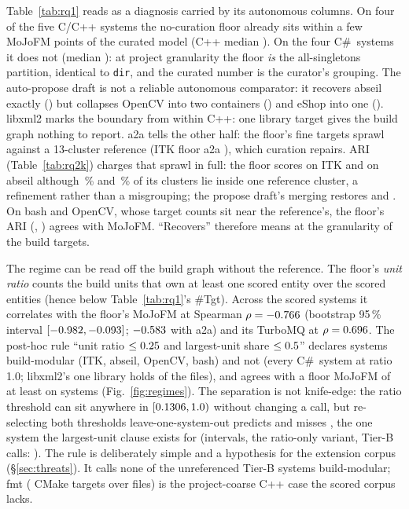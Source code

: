 Table~\ref{tab:rq1} reads as a diagnosis carried by its autonomous columns. On four of the five
C/C++ systems the no-curation floor already sits within a few MoJoFM points of the curated model
(C++ median \rqOneFloorCppMoJo{}). On the four C\#\ systems it does not (median
\rqOneFloorCsMoJo{}): at project granularity the floor \emph{is} the all-singletons partition,
identical to \texttt{dir}, and the curated number is the curator's grouping. The auto-propose
draft is not a reliable autonomous comparator: it recovers abseil exactly
(\rqOneProposeAbseilMoJo{}) but collapses OpenCV into two containers (\rqOneProposeOpencvMoJo{})
and eShop into one (\rqOneProposeEshopMoJo{}). libxml2 marks the boundary from within C++: one
library target gives the build graph nothing to report. a2a tells the other half: the floor's
fine targets sprawl against a 13-cluster reference (ITK floor a2a \rqOneFloorItkAtoA{}), which
curation repairs. ARI (Table~\ref{tab:rq2k}) charges that sprawl in full: the floor scores
\rqOneFloorItkAri{} on ITK and \rqOneFloorAbseilAri{} on abseil although \rqOneFloorItkNested{}\,\%
and \rqOneFloorAbseilNested{}\,\% of its clusters lie inside one reference cluster, a refinement
rather than a misgrouping; the propose draft's merging restores \rqOneProposeItkAri{} and
\rqOneProposeAbseilAri{}. On bash and OpenCV, whose target counts sit near the reference's, the
floor's ARI (\rqOneFloorBashAri{}, \rqOneFloorOpencvAri{}) agrees with MoJoFM. ``Recovers''
therefore means at the granularity of the build targets.

The regime can be read off the build graph without the reference. The floor's \emph{unit ratio}
counts the build units that own at least one scored entity over the scored entities (hence below
Table~\ref{tab:rq1}'s \#Tgt). Across the \rqAdequacyN{} scored systems it correlates with the
floor's MoJoFM at Spearman $\rho=-0.766{}$ (bootstrap 95\,\% interval
$[-0.982{}, -0.093{}]$; $-0.583{}$ with a2a) and its
TurboMQ at $\rho=0.696{}$. The post-hoc rule ``unit ratio
$\le0.25{}$ and largest-unit share $\le0.5{}$'' declares
\rqAdequacyAdequateCount{} systems build-modular (ITK, abseil, OpenCV, bash) and
\rqAdequacyInadequateCount{} not (every C\#\ system at ratio 1.0; libxml2's one library holds
\rqAdequacyLibxmlLargestShare{} of the files), and agrees with a floor MoJoFM of at least
\rqTwoRecoveredMin{} on \rqAdequacyRuleAgreement{} systems (Fig.~\ref{fig:regimes}). The
separation is not knife-edge: the ratio threshold can sit anywhere in
$[0.1306{}, 1.0{})$ without changing a call, but
re-selecting both thresholds leave-one-system-out predicts \rqAdequacyLooCorrect{} and misses
\rqAdequacyLooWrong{}, the one system the largest-unit clause exists for (intervals, the
ratio-only variant, Tier-B calls: \trDiagnostic{}). The rule is deliberately simple and a hypothesis for the extension corpus
(\S\ref{sec:threats}). It calls none of the \rqAdequacyTierBSystems{} unreferenced Tier-B
systems build-modular; fmt (\rqAdequacyFmtUnits{} CMake targets over \rqAdequacyFmtEntities{}
files) is the project-coarse C++ case the scored corpus lacks.

